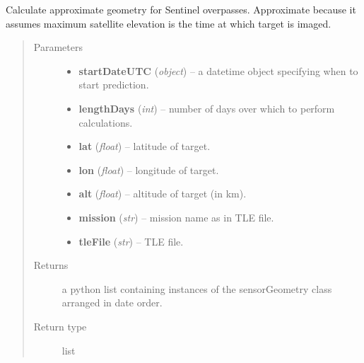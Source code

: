 \documentclass[letterpaper,10pt,english]{sphinxmanual}
\begin{document}
\begin{fulllineitems}
\label{source/sentinelSimulator:sentinelSimulator.satelliteGeometry.getSentinel2Geometry}
Calculate approximate geometry for Sentinel overpasses.
Approximate because it assumes maximum satellite elevation
is the time at which target is imaged.
\begin{quote}\begin{description}
\item[{Parameters}] \leavevmode\begin{itemize}
\item {} 
\textbf{startDateUTC} (\emph{object}) -- a datetime object specifying when to start prediction.

\item {} 
\textbf{lengthDays} (\emph{int}) -- number of days over which to perform calculations.

\item {} 
\textbf{lat} (\emph{float}) -- latitude of target.

\item {} 
\textbf{lon} (\emph{float}) -- longitude of target.

\item {} 
\textbf{alt} (\emph{float}) -- altitude of target (in km).

\item {} 
\textbf{mission} (\emph{str}) -- mission name as in TLE file.

\item {} 
\textbf{tleFile} (\emph{str}) -- TLE file.

\end{itemize}

\item[{Returns}] \leavevmode
a python list containing instances of the sensorGeometry class arranged in date order.

\item[{Return type}] \leavevmode
list

\end{description}\end{quote}

\end{fulllineitems}

\end{document}
